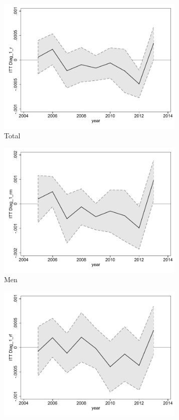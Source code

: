 \documentclass[a4paper ]{article}
\begin{document}
\begin{figure}[h!]
	\centering
	\begin{subfigure}[t]{0.31\textwidth}
		\centering
		\includegraphics[width=0.99\textwidth]{R1_LC_Diag_1_r}
		\caption{Total}		
	\end{subfigure}
	\begin{subfigure}[t]{0.31\textwidth}
		\centering
		\includegraphics[width=0.99\textwidth]{R1_LC_Diag_1_rm}
		\caption{Men}		
	\end{subfigure}
	\quad
	\begin{subfigure}[t]{0.31\textwidth}
		\centering
		\includegraphics[width=0.99\textwidth]{R1_LC_Diag_1_rf}

\end{subfigure}
\end{figure}
\end{document}
